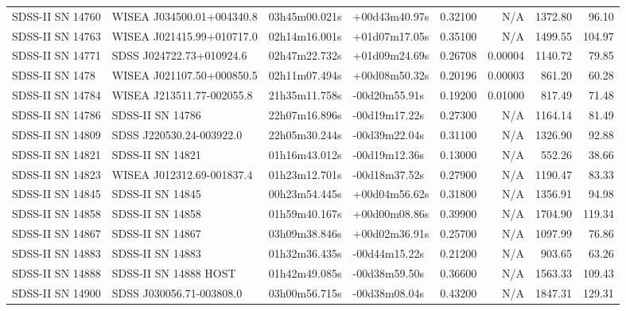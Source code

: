 \begin{longtable}{llllrrrr}
SDSS-II SN 14760 &       WISEA J034500.01+004340.8 &   03h45m00.021s &   +00d43m40.97s &  0.32100 &      N/A &  1372.80 &       96.10 \\
SDSS-II SN 14763 &       WISEA J021415.99+010717.0 &   02h14m16.001s &   +01d07m17.05s &  0.35100 &      N/A &  1499.55 &      104.97 \\
SDSS-II SN 14771 &        SDSS J024722.73+010924.6 &   02h47m22.732s &   +01d09m24.69s &  0.26708 &  0.00004 &  1140.72 &       79.85 \\
SDSS-II SN 1478  &       WISEA J021107.50+000850.5 &   02h11m07.494s &   +00d08m50.32s &  0.20196 &  0.00003 &   861.20 &       60.28 \\
SDSS-II SN 14784 &       WISEA J213511.77-002055.8 &   21h35m11.758s &   -00d20m55.91s &  0.19200 &  0.01000 &   817.49 &       71.48 \\
SDSS-II SN 14786 &                SDSS-II SN 14786 &   22h07m16.896s &   -00d19m17.22s &  0.27300 &      N/A &  1164.14 &       81.49 \\
SDSS-II SN 14809 &        SDSS J220530.24-003922.0 &   22h05m30.244s &   -00d39m22.04s &  0.31100 &      N/A &  1326.90 &       92.88 \\
SDSS-II SN 14821 &                SDSS-II SN 14821 &   01h16m43.012s &   -00d19m12.36s &  0.13000 &      N/A &   552.26 &       38.66 \\
SDSS-II SN 14823 &       WISEA J012312.69-001837.4 &   01h23m12.701s &   -00d18m37.52s &  0.27900 &      N/A &  1190.47 &       83.33 \\
SDSS-II SN 14845 &                SDSS-II SN 14845 &   00h23m54.445s &   +00d04m56.62s &  0.31800 &      N/A &  1356.91 &       94.98 \\
SDSS-II SN 14858 &                SDSS-II SN 14858 &   01h59m40.167s &   +00d00m08.86s &  0.39900 &      N/A &  1704.90 &      119.34 \\
SDSS-II SN 14867 &                SDSS-II SN 14867 &   03h09m38.846s &   +00d02m36.91s &  0.25700 &      N/A &  1097.99 &       76.86 \\
SDSS-II SN 14883 &                SDSS-II SN 14883 &   01h32m36.435s &   -00d44m15.22s &  0.21200 &      N/A &   903.65 &       63.26 \\
SDSS-II SN 14888 &           SDSS-II SN 14888 HOST &   01h42m49.085s &   -00d38m59.50s &  0.36600 &      N/A &  1563.33 &      109.43 \\
SDSS-II SN 14900 &        SDSS J030056.71-003808.0 &   03h00m56.715s &   -00d38m08.04s &  0.43200 &      N/A &  1847.31 &      129.31 \\

\end{longtable}
